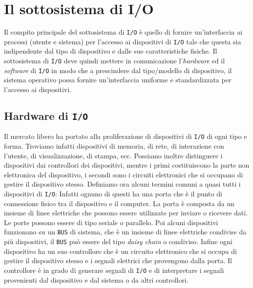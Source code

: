\chapter{Il sottosistema di I/O}

Il compito principale del sottosistema di \texttt{I/O} è quello di fornire un'interfaccia ai processi (utente e sistema) per l'accesso ai dispositivi di \texttt{I/O} tale che questa sia indipendente dal tipo di dispositivo e dalle sue caratteristiche fisiche. Il sottosistema di \texttt{I/O} deve quindi mettere in comunicazione l'\textit{hardware} ed il \textit{software} di \texttt{I/O} in modo che a prescindere dal tipo/modello di dispositivo, il sistema operativo possa fornire un'interfaccia uniforme e standardizzata per l'accesso ai dispositivi.

\section{Hardware di \texttt{I/O}}
    Il mercato libero ha portato alla proliferazione di dispositivi di \texttt{I/O} di ogni tipo e forma. Troviamo infatti dispositivi di memoria, di rete, di interazione con l'utente, di visualizzazione, di stampa, ecc. Possiamo inoltre distinguere i dispositivi dai controllori dei dispositivi, mentre i primi costituiscono la parte non elettronica del dispositivo, i secondi sono i circuiti elettronici che si occupano di gestire il dispositivo stesso.\newline
    Definiamo ora alcuni termini comuni a quasi tutti i dispositivi di \texttt{I/O}: Infatti ognuno di questi ha una porta che è il punto di connessione fisico tra il dispositivo e il computer. La porta è composta da un insieme di linee elettriche che possono essere utilizzate per inviare o ricevere dati. Le porte possono essere di tipo seriale o parallelo. Poi alcuni dispositivi funzionano su un \texttt{BUS} di sistema, che è un insieme di linee elettriche condivise da più dispositivi, il \texttt{BUS} può essere del tipo \textit{daisy chain} o condiviso. Infine ogni dispositivo ha un suo controllore che è un circuito elettronico che si occupa di gestire il dispositivo stesso e i segnali elettrici che provengono dalla porta. Il controllore è in grado di generare segnali di \texttt{I/O} e di interpretare i segnali provenienti dal dispositivo e dal sistema o da altri controllori.

